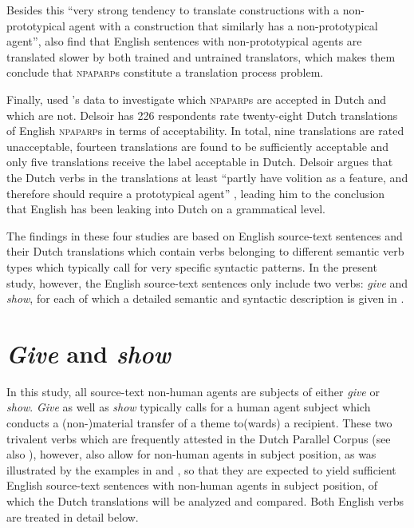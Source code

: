 \documentclass[output=paper]{LSP/langsci}
\begin{document}
Besides this “very strong tendency to translate constructions with a non-prototypical agent with a construction that similarly has a non-prototypical agent”, \citet[11]{Vandepitte2011} also find that English sentences with non-prototypical agents are translated slower by both trained and untrained translators, which makes them conclude that \textsc{npaparp}s constitute a translation process problem. 

Finally, \citet{Delsoir2011} used \citeauthor{Vandepitte2011}'s \citeyear{Vandepitte2011} data to investigate which \textsc{npaparp}s are accepted in Dutch and which are not. Delsoir has 226 respondents rate twenty-eight Dutch translations of English \textsc{npaparp}s in terms of acceptability. In total, nine translations are rated unacceptable, fourteen translations are found to be sufficiently acceptable and only five translations receive the label acceptable in Dutch. Delsoir argues that the Dutch verbs in the translations at least “partly have volition as a feature, and therefore should require a prototypical agent” \citet[34]{Vandepitte2011}, leading him to the conclusion that English has been leaking into Dutch on a grammatical level. 

The findings in these four studies are based on English source-text sentences and their Dutch translations which contain verbs belonging to different semantic verb types which typically call for very specific syntactic patterns. In the present study, however, the English source-text sentences only include two verbs: \textit{give} and \textit{show}, for each of which a detailed semantic and syntactic description is given in .  

\section{\textit{Give} and \textit{show}} \label{sec:5:4}

In this study, all source-text non-human agents are subjects of either \textit{give} or \textit{show}. \textit{Give} as well as \textit{show} typically calls for a human agent subject which conducts a (non-)material transfer of a theme to(wards) a recipient. These two trivalent verbs which are frequently attested in the Dutch Parallel Corpus (see also ), however, also allow for non-human agents in subject position, as was illustrated by the examples in  and , so that they are expected to yield sufficient English source-text sentences with non-human agents in subject position, of which the Dutch translations will be analyzed and compared. Both English verbs are treated in detail below.  
  
\end{document}

